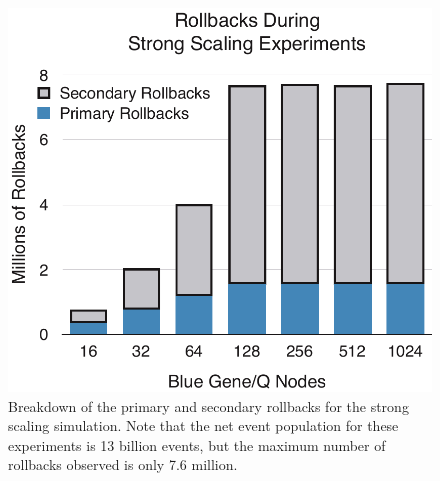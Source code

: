 \begin{figure}[t!]
\centering
\includegraphics[width=\linewidth]{result_img/rollbacks_bargraph.pdf}
\caption{
	Breakdown of the primary and secondary rollbacks for the strong scaling simulation.
	Note that the net event population for these experiments is 13 billion events, but the maximum number of rollbacks observed is only 7.6 million.
}
\label{fig:rollback}
\end{figure}
